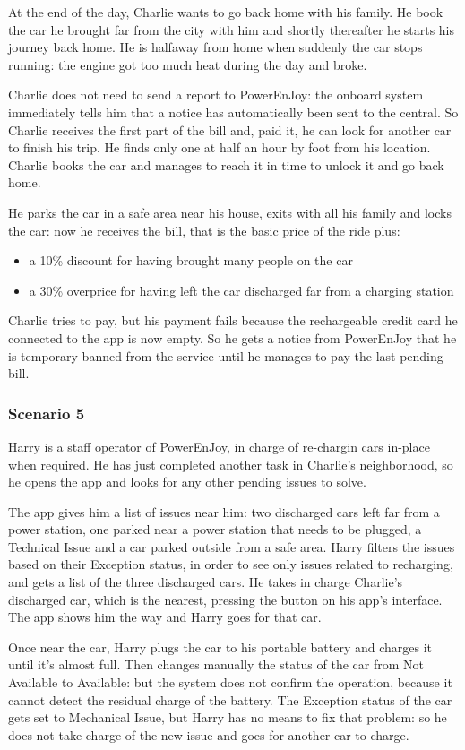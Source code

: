 \documentclass[11pt]{article} %
\newcommand{\pe}{PowerEnJoy }
\newcommand{\pecomma}{PowerEnJoy, }
\begin{document}
At the end of the day, Charlie wants to go back home with his family. He book the car he brought far from the city with him and shortly thereafter he starts his journey back home. He is halfaway from home when suddenly the car stops running: the engine got too much heat during the day and broke.

Charlie does not need to send a report to PowerEnJoy: the onboard system immediately tells him that a notice has automatically been sent to the central. So Charlie receives the first part of the bill and, paid it, he can look for another car to finish his trip. He finds only one at half an hour by foot from his location. Charlie books the car and manages to reach it in time to unlock it and go back home.

He parks the car in a safe area near his house, exits with all his family and locks the car: now he receives the bill, that is the basic price of the ride plus:
\begin{itemize}
	\item a 10\% discount for having brought many people on the car
	\item a 30\% overprice for having left the car discharged far from a charging station
\end{itemize}
Charlie tries to pay, but his payment fails because the rechargeable credit card he connected to the app is now empty. So he gets a notice from \pe that he is temporary banned from the service until he manages to pay the last pending bill.

\subsubsection{Scenario 5}
Harry is a staff operator of \pecomma in charge of re-chargin cars in-place when required. He has just completed another task in Charlie's neighborhood, so he opens the app and looks for any other pending issues to solve.

The app gives him a list of issues near him: two discharged cars left far from a power station, one parked near a power station that needs to be plugged, a Technical Issue and a car parked outside from a safe area. Harry filters the issues based on their Exception status, in order to see only issues related to recharging, and gets a list of the three discharged cars. He takes in charge Charlie's discharged car, which is the nearest, pressing the button on his app's interface. The app shows him the way and Harry goes for that car.

Once near the car, Harry plugs the car to his portable battery and charges it until it's almost full. Then changes manually the status of the car from Not Available to Available: but the system does not confirm the operation, because it cannot detect the residual charge of the battery. The Exception status of the car gets set to Mechanical Issue, but Harry has no means to fix that problem: so he does not take charge of the new issue and goes for another car to charge.
\end{document}

